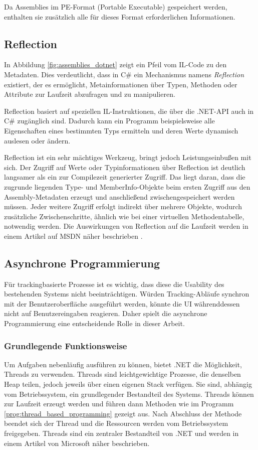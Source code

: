 Da Assemblies im PE-Format (Portable Executable) \cite{MicrosoftLearn_PEFormat} gespeichert werden, enthalten sie zusätzlich alle für dieses Format erforderlichen Informationen.

\subsection{Reflection}
\label{subsec:reflection}
In Abbildung \ref{fig:assemblies_dotnet} zeigt ein Pfeil vom IL-Code zu den Metadaten. Dies verdeutlicht, dass in C\# ein Mechanismus namens \textit{Reflection} \cite{MicrosoftLearn_Reflection} existiert, der es ermöglicht, Metainformationen über Typen, Methoden oder Attribute zur Laufzeit abzufragen und zu manipulieren. 

Reflection basiert auf speziellen IL-Instruktionen, die über die .NET-API auch in C\# zugänglich sind. Dadurch kann ein Programm beispielsweise alle Eigenschaften eines bestimmten Typs ermitteln und deren Werte dynamisch auslesen oder ändern. 

Reflection ist ein sehr mächtiges Werkzeug, bringt jedoch Leistungseinbußen mit sich. Der Zugriff auf Werte oder Typinformationen über Reflection ist deutlich langsamer als ein zur Compilezeit generierter Zugriff. Das liegt daran, dass die zugrunde liegenden Type- und MemberInfo-Objekte beim ersten Zugriff aus den Assembly-Metadaten erzeugt und anschließend zwischengespeichert werden müssen. Jeder weitere Zugriff erfolgt indirekt über mehrere Objekte, wodurch zusätzliche Zwischenschritte, ähnlich wie bei einer virtuellen Methodentabelle, notwendig werden. Die Auswirkungen von Reflection auf die Laufzeit werden in einem Artikel auf MSDN näher beschrieben \cite{Pobar2005_PerformancePitfalls}.


\subsection{Asynchrone Programmierung}
\label{subsec:async}
Für trackingbasierte Prozesse ist es wichtig, dass diese die Usability des bestehenden Systems nicht beeinträchtigen. Würden Tracking-Abläufe synchron mit der Benutzeroberfläche ausgeführt werden, könnte die UI währenddessen nicht auf Benutzereingaben reagieren. Daher spielt die asynchrone Programmierung eine entscheidende Rolle in dieser Arbeit.

\subsubsection{Grundlegende Funktionsweise}
Um Aufgaben nebenläufig ausführen zu können, bietet .NET die Möglichkeit, Threads zu verwenden. Threads sind leichtgewichtige Prozesse, die denselben Heap teilen, jedoch jeweils über einen eigenen Stack verfügen. Sie sind, abhängig vom Betriebssystem, ein grundlegender Bestandteil des Systems. Threads können zur Laufzeit erzeugt werden und führen dann Methoden wie im Programm \ref{prog:thread_based_programming} gezeigt aus. Nach Abschluss der Methode beendet sich der Thread und die Ressourcen werden vom Betriebssystem freigegeben. Threads sind ein zentraler Bestandteil von .NET und werden in einem Artikel von Microsoft \cite{Microsoft_ThreadsAndThreading} näher beschrieben.

